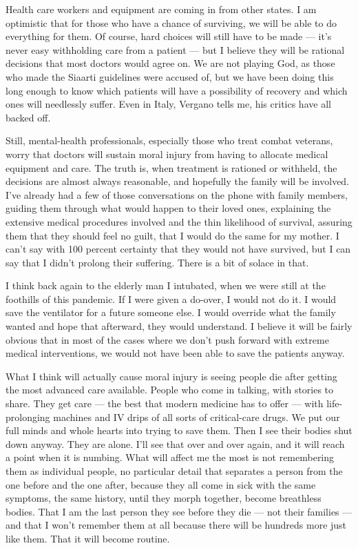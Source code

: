 Health care workers and equipment are coming in from other states. I am
optimistic that for those who have a chance of surviving, we will be
able to do everything for them. Of course, hard choices will still have
to be made --- it's never easy withholding care from a patient --- but I
believe they will be rational decisions that most doctors would agree
on. We are not playing God, as those who made the Siaarti guidelines
were accused of, but we have been doing this long enough to know which
patients will have a possibility of recovery and which ones will
needlessly suffer. Even in Italy, Vergano tells me, his critics have all
backed off.

Still, mental-health professionals, especially those who treat combat
veterans, worry that doctors will sustain moral injury from having to
allocate medical equipment and care. The truth is, when treatment is
rationed or withheld, the decisions are almost always reasonable, and
hopefully the family will be involved. I've already had a few of those
conversations on the phone with family members, guiding them through
what would happen to their loved ones, explaining the extensive medical
procedures involved and the thin likelihood of survival, assuring them
that they should feel no guilt, that I would do the same for my mother.
I can't say with 100 percent certainty that they would not have
survived, but I can say that I didn't prolong their suffering. There is
a bit of solace in that.

I think back again to the elderly man I intubated, when we were still at
the foothills of this pandemic. If I were given a do-over, I would not
do it. I would save the ventilator for a future someone else. I would
override what the family wanted and hope that afterward, they would
understand. I believe it will be fairly obvious that in most of the
cases where we don't push forward with extreme medical interventions, we
would not have been able to save the patients anyway.

What I think will actually cause moral injury is seeing people die after
getting the most advanced care available. People who come in talking,
with stories to share. They get care --- the best that modern medicine
has to offer --- with life-prolonging machines and IV drips of all sorts
of critical-care drugs. We put our full minds and whole hearts into
trying to save them. Then I see their bodies shut down anyway. They are
alone. I'll see that over and over again, and it will reach a point when
it is numbing. What will affect me the most is not remembering them as
individual people, no particular detail that separates a person from the
one before and the one after, because they all come in sick with the
same symptoms, the same history, until they morph together, become
breathless bodies. That I am the last person they see before they die
--- not their families --- and that I won't remember them at all because
there will be hundreds more just like them. That it will become routine.

